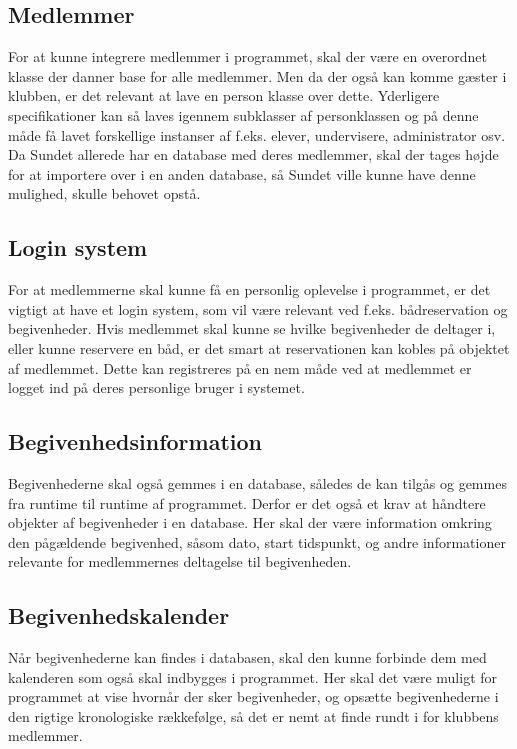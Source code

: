 \subsection{Medlemmer}

For at kunne integrere medlemmer i programmet, skal der være en overordnet klasse der danner base for alle
medlemmer. Men da der også kan komme gæster i klubben, er det relevant at lave en person klasse over dette.
Yderligere specifikationer kan så laves igennem subklasser af personklassen og på denne måde få lavet forskellige
instanser af f.eks. elever, undervisere, administrator osv. Da Sundet allerede har en database med deres medlemmer, skal
der tages højde for at importere over i en anden database, så Sundet ville kunne have denne mulighed, skulle behovet
opstå.

\subsection{Login system}

For at medlemmerne skal kunne få en personlig oplevelse i programmet, er det vigtigt at have et login system, som vil
være relevant ved f.eks. bådreservation og begivenheder. Hvis medlemmet skal kunne se hvilke begivenheder de deltager i,
eller kunne reservere en båd, er det smart at reservationen kan kobles på objektet af medlemmet. Dette kan
registreres på en nem måde ved at medlemmet er logget ind på deres personlige bruger i systemet.


\subsection{Begivenhedsinformation}

Begivenhederne skal også gemmes i en database, således de kan tilgås og gemmes fra runtime til runtime af programmet. 
Derfor er det også et krav at håndtere objekter af begivenheder i en database. Her skal der være information omkring den
pågældende begivenhed, såsom dato, start tidspunkt, og andre informationer relevante for medlemmernes deltagelse til
begivenheden.

\subsection{Begivenhedskalender}

Når begivenhederne kan findes i databasen, skal den kunne forbinde dem med kalenderen som også skal indbygges i
programmet. Her skal det være muligt for programmet at vise hvornår der sker begivenheder, og opsætte begivenhederne i
den rigtige kronologiske rækkefølge, så det er nemt at finde rundt i for klubbens medlemmer.

